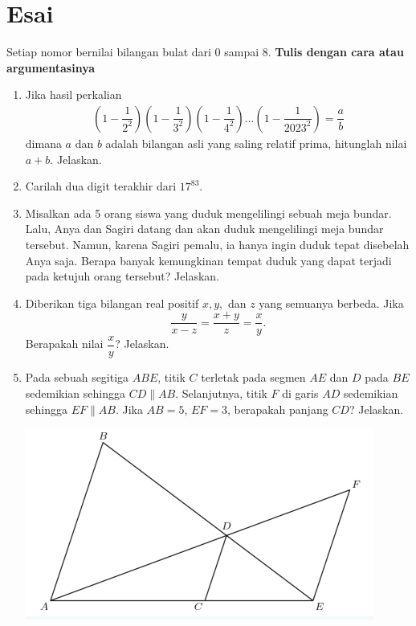 \documentclass[11pt]{scrartcl}
\begin{document}
\newpage
\section{Esai}
Setiap nomor bernilai bilangan bulat dari 0 sampai 8. \textbf{Tulis dengan cara atau argumentasinya}
\begin{enumerate}
    \item Jika hasil  perkalian
\begin{align*}
    \left(1-\dfrac{1}{2^2}\right)\left(1-\dfrac{1}{3^2}\right)\left(1-\dfrac{1}{4^2}\right)\dots \left(1-\dfrac{1}{2023^2}\right) = \dfrac{a}{b}
\end{align*}
dimana $a$ dan $b$ adalah bilangan asli yang saling relatif prima, hitunglah nilai $a+b$. Jelaskan.

\item Carilah dua digit terakhir dari $17^{83}$.

\item Misalkan ada 5 orang siswa yang duduk mengelilingi sebuah meja bundar. Lalu, Anya dan Sagiri datang dan akan duduk mengelilingi meja bundar tersebut. Namun, karena Sagiri pemalu, ia hanya ingin duduk tepat disebelah Anya saja. Berapa banyak kemungkinan tempat duduk yang dapat terjadi pada ketujuh orang tersebut? Jelaskan.

\item Diberikan tiga bilangan real positif $x,y,$ dan $z$ yang semuanya berbeda. Jika 
$$\dfrac{y}{x-z}=\dfrac{x+y}{z}=\dfrac{x}{y}.$$ Berapakah nilai $\dfrac{x}{y}$? Jelaskan.

\item Pada sebuah segitiga $ABE$, titik $C$ terletak pada segmen $AE$ dan $D$ pada $BE$ sedemikian sehingga $CD \parallel AB$. Selanjutnya, titik $F$ di garis $AD$ sedemikian sehingga $EF \parallel AB$. Jika $AB=5$, $EF=3$, berapakah panjang $CD$? Jelaskan.
\begin{center}
    \includegraphics[scale=0.8]{soal tes geom.PNG}
\end{center}

\end{enumerate}
\end{document}
